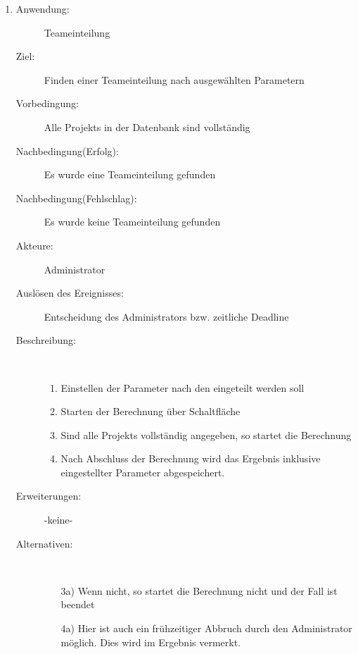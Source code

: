 \documentclass[parskip=full]{scrartcl}
\newcommand{\swtLabel}[1]{\textbf{/#1\arabic*0/}}
\begin{document}
\begin{enumerate} [label=\swtLabel{A}]
  
  \item
  \begin{description}
  \item[Anwendung:] Teameinteilung
  \item[Ziel:] Finden einer Teameinteilung nach ausgewählten Parametern
  	\item[Vorbedingung:] Alle \glspl{Projekt} in der Datenbank sind vollständig
  	\item[Nachbedingung(Erfolg):] Es wurde eine Teameinteilung gefunden
  	\item[Nachbedingung(Fehlschlag):] Es wurde keine Teameinteilung gefunden
  	\item[Akteure:] Administrator
  	\item[Auslösen des Ereignisses:] Entscheidung des Administrators bzw.
  	zeitliche Deadline
  	\item[Beschreibung:]~
  	\begin{enumerate} 
  	  \item Einstellen der Parameter nach den eingeteilt werden soll
  	  \item Starten der Berechnung über Schaltfläche
  	  \item Sind alle \glspl{Projekt} vollständig angegeben, so startet die Berechnung
  	  \item Nach Abschluss der Berechnung wird das Ergebnis inklusive
  	  eingestellter Parameter abgespeichert.
  	\end{enumerate}
  	\item[Erweiterungen:] -keine-
  	\item[Alternativen:] ~
  	\begin{enumerate}
  	  \item[3a)] Wenn nicht, so startet die Berechnung nicht und der Fall ist
  	  beendet
  	  \item[4a)] Hier ist auch ein frühzeitiger Abbruch durch den Administrator
  	  möglich. Dies wird im Ergebnis vermerkt.
  	 \end{enumerate}  
  \end{description}
   

\end{enumerate}
\end{document}
